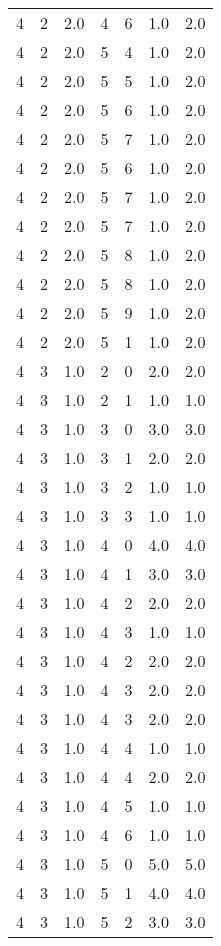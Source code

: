 \documentclass[a4paper,12pt]{article}
\begin{document}
\begin{center}
\begin{longtable}{ c c c | c c c | c }
        4 & 2 & 2.0 & 4 & 6 & 1.0 & 2.0 \\
        4 & 2 & 2.0 & 5 & 4 & 1.0 & 2.0 \\
        4 & 2 & 2.0 & 5 & 5 & 1.0 & 2.0 \\
        4 & 2 & 2.0 & 5 & 6 & 1.0 & 2.0 \\
        4 & 2 & 2.0 & 5 & 7 & 1.0 & 2.0 \\
        4 & 2 & 2.0 & 5 & 6 & 1.0 & 2.0 \\
        4 & 2 & 2.0 & 5 & 7 & 1.0 & 2.0 \\
        4 & 2 & 2.0 & 5 & 7 & 1.0 & 2.0 \\
        4 & 2 & 2.0 & 5 & 8 & 1.0 & 2.0 \\
        4 & 2 & 2.0 & 5 & 8 & 1.0 & 2.0 \\
        4 & 2 & 2.0 & 5 & 9 & 1.0 & 2.0 \\
        4 & 2 & 2.0 & 5 & 1 & 1.0 & 2.0 \\
        4 & 3 & 1.0 & 2 & 0 & 2.0 & 2.0 \\
        4 & 3 & 1.0 & 2 & 1 & 1.0 & 1.0 \\
        4 & 3 & 1.0 & 3 & 0 & 3.0 & 3.0 \\
        4 & 3 & 1.0 & 3 & 1 & 2.0 & 2.0 \\
        4 & 3 & 1.0 & 3 & 2 & 1.0 & 1.0 \\
        4 & 3 & 1.0 & 3 & 3 & 1.0 & 1.0 \\
        4 & 3 & 1.0 & 4 & 0 & 4.0 & 4.0 \\
        4 & 3 & 1.0 & 4 & 1 & 3.0 & 3.0 \\
        4 & 3 & 1.0 & 4 & 2 & 2.0 & 2.0 \\
        4 & 3 & 1.0 & 4 & 3 & 1.0 & 1.0 \\
        4 & 3 & 1.0 & 4 & 2 & 2.0 & 2.0 \\
        4 & 3 & 1.0 & 4 & 3 & 2.0 & 2.0 \\
        4 & 3 & 1.0 & 4 & 3 & 2.0 & 2.0 \\
        4 & 3 & 1.0 & 4 & 4 & 1.0 & 1.0 \\
        4 & 3 & 1.0 & 4 & 4 & 2.0 & 2.0 \\
        4 & 3 & 1.0 & 4 & 5 & 1.0 & 1.0 \\
        4 & 3 & 1.0 & 4 & 6 & 1.0 & 1.0 \\
        4 & 3 & 1.0 & 5 & 0 & 5.0 & 5.0 \\
        4 & 3 & 1.0 & 5 & 1 & 4.0 & 4.0 \\
        4 & 3 & 1.0 & 5 & 2 & 3.0 & 3.0 \\

\end{longtable}
\end{center}
\end{document}
